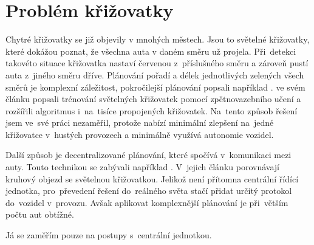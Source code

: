 \section{Problém křižovatky}\label{sec:problem}

%


Chytré křižovatky se již objevily v mnohých městech.
Jsou to světelné křižovatky, které dokážou poznat, že všechna auta v daném směru už projela.
Při~detekci takovéto situace křižovatka nastaví červenou z~příslušného směru a zároveň pustí auta z~jiného směru dříve.
Plánování pořadí a délek jednotlivých zelených všech směrů je komplexní záležitost, pokročilejší plánování popsali například \citet*{Goldstein}.
\citet*{Liang} ve svém článku popsali trénování světelných křižovatek pomocí zpětnovazebního učení
a rozšířili algoritmus i~na~tisíce propojených křižovatek.
Na~tento způsob řešení jsem ve~své práci nezaměřil, protože nabízí minimální zlepšení
na~jedné křižovatce v~hustých provozech a minimálně využívá autonomie vozidel.

Další způsob je decentralizované plánování, které spočívá v~komunikaci mezi auty.
Touto technikou se zabývali například \citet*{Wu}.
V~jejich článku porovnávají kruhový objezd se světelnou křižovatkou.
Jelikož není přítomna centrální řídící jednotka, pro~převedení řešení
do~reálného světa stačí přidat určitý protokol do~vozidel v~provozu.
Avšak aplikovat komplexnější plánování je při~větším počtu aut obtížné.

Já se zaměřím pouze na postupy s~centrální jednotkou.


